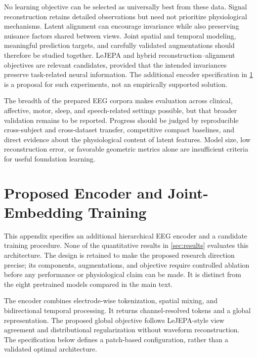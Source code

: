 \documentclass{article}
\begin{document}
No learning objective can be selected as universally best from these data.
Signal reconstruction retains detailed observations but need not prioritize
physiological mechanisms. Latent alignment can encourage invariance while
also preserving nuisance factors shared between views. Joint spatial and
temporal modeling, meaningful prediction targets, and carefully validated
augmentations should therefore be studied together. LeJEPA and hybrid
reconstruction--alignment objectives are relevant candidates, provided
that the intended invariances preserve task-related neural information.
The additional encoder specification in \cref{sec:proposed-encoder} is a
proposal for such experiments, not an empirically supported solution.

The breadth of the prepared EEG corpora makes evaluation across clinical,
affective, motor, sleep, and speech-related settings possible, but that
broader validation remains to be reported. Progress should be judged by
reproducible cross-subject and cross-dataset transfer, competitive compact
baselines, and direct evidence about the physiological content of latent
features. Model size, low reconstruction error, or favorable geometric
metrics alone are insufficient criteria for useful foundation learning.

\begingroup
\small
\raggedright

\endgroup

\clearpage
\nobalance
\appendix
\setcounter{equation}{0}
\renewcommand{\theequation}{A.\arabic{equation}}
\section{Proposed Encoder and Joint-Embedding Training}
\label{sec:proposed-encoder}

This appendix specifies an additional hierarchical EEG encoder and a
candidate training procedure. None of the quantitative results in
\cref{sec:results} evaluates this architecture. The design is retained to
make the proposed research direction precise; its components, augmentations,
and objective require controlled ablation before any performance or
physiological claim can be made. It is distinct from the eight pretrained
models compared in the main text.

The encoder combines electrode-wise tokenization, spatial mixing, and
bidirectional temporal processing. It returns channel-resolved tokens
and a global representation. The proposed global objective follows
LeJEPA-style view agreement and distributional regularization without
waveform reconstruction. The specification below defines a patch-based
configuration, rather than a validated optimal architecture.
\end{document}
